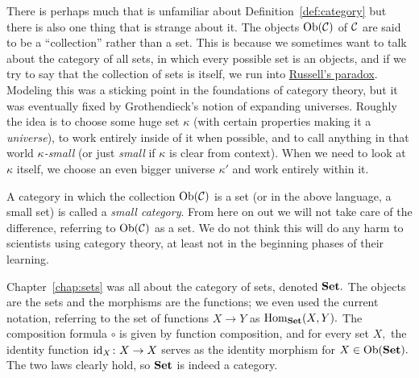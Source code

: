 \documentclass[../main/CT4S-EN-RU]{subfiles}
\begin{document}
\begin{definitionRUS}\label{def:category}
\end{definitionRUS}

\begin{remarkENG}\label{rmk:small}
There is perhaps much that is unfamiliar about Definition~\ref{def:category} but there is also one thing that is strange about it. The objects $\operatorname{Ob}(\mathcal{C})$ of $\mathcal{C}$ are said to be a “collection” rather than a set. This is because we sometimes want to talk about the category of all sets, in which every possible set is an objects, and if we try to say that the collection of sets is itself, we run into \href{http://en.wikipedia.org/wiki/Russell's_paradox}{\text Russell's paradox}. Modeling this was a sticking point in the foundations of category theory, but it was eventually fixed by Grothendieck's notion of expanding universes. Roughly the idea is to choose some huge set $\kappa$ (with certain properties making it a {\em universe}), to work entirely inside of it when possible, and to call anything in that world {\em $\kappa$-small} (or just {\em small} if $\kappa$ is clear from context). When we need to look at $\kappa$ itself, we  choose an even bigger universe $\kappa'$ and work entirely within it.

A category in which the collection $\operatorname{Ob}(\mathcal{C})$ is a set (or in the above language, a small set) is called a {\em small category}. From here on out we will not take care of the difference, referring to $\operatorname{Ob}(\mathcal{C})$ as a set. We do not think this will do any harm to scientists using category theory, at least not in the beginning phases of their learning.
\end{remarkENG}

\begin{remarkRUS}\label{rmk:small}
\end{remarkRUS}

\begin{exampleENG}
Chapter~\ref{chap:sets} was all about the category of sets, denoted ${\mathbf{Set}}.$ The objects are the sets and the morphisms are the functions; we even used the current notation, referring to the set of functions $X\to Y$ as $\operatorname{Hom}_{\mathbf{Set}}(X,Y).$ The composition formula $\circ$ is given by function composition, and for every set $X,$ the identity function $\operatorname{id}_X\colon X\rightarrow X$ serves as the identity morphism for $X\in\operatorname{Ob}({\mathbf{Set}}).$ The two laws clearly hold, so ${\mathbf{Set}}$ is indeed a category. 
\end{exampleENG}
\end{document}
